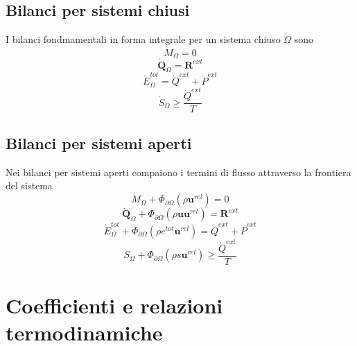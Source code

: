 \section{Bilanci per sistemi chiusi}
I bilanci fondmamentali in forma integrale per un sistema chiuso $\Omega$ sono
\begin{equation}
    \dot{M}_{\Omega} = 0
\end{equation}
\begin{equation}
    \dot{\mathbf{Q}}_{\Omega} = \mathbf{R}^{ext}
\end{equation}
\begin{equation}
    \dot{E}^{tot}_{\Omega} = \dot{Q}^{ext} + \dot{P}^{ext}
\end{equation}
\begin{equation}
    \dot{S}_{\Omega} \ge \dfrac{\dot{Q}^{ext}}{T}
\end{equation}

\section{Bilanci per sistemi aperti}
Nei bilanci per sistemi aperti compaiono i termini di flusso attraverso la frontiera del sistema
\begin{equation}
    \dot{M}_{\Omega} + \Phi_{\partial \Omega}(\rho \mathbf{u}^{rel}) = 0
\end{equation}
\begin{equation}
    \dot{\mathbf{Q}}_{\Omega} + \Phi_{\partial \Omega}(\rho \mathbf{u} \mathbf{u}^{rel}) = \mathbf{R}^{ext}
\end{equation}
\begin{equation}
    \dot{E}^{tot}_{\Omega} + \Phi_{\partial \Omega}(\rho e^{tot} \mathbf{u}^{rel}) = \dot{Q}^{ext} + \dot{P}^{ext}
\end{equation}
\begin{equation}
    \dot{S}_{\Omega} + \Phi_{\partial \Omega}(\rho s \mathbf{u}^{rel}) \ge \dfrac{\dot{Q}^{ext}}{T}
\end{equation}


\chapter{Coefficienti e relazioni termodinamiche}

